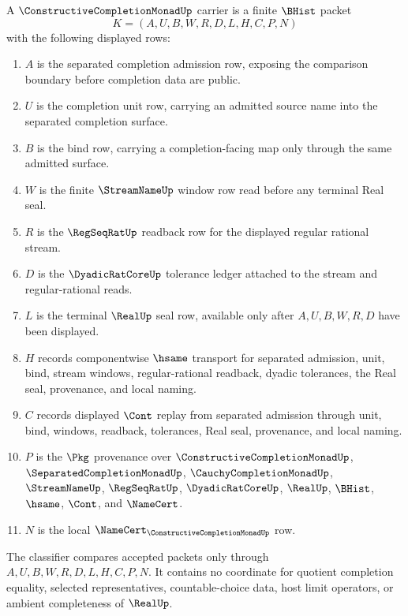 \begin{definition}
\label{def:constructive-completion-monad-carrier}
A $\ConstructiveCompletionMonadUp$ carrier is a finite $\BHist$ packet
$$
K=(A,U,B,W,R,D,L,H,C,P,N)
$$
with the following displayed rows:
\begin{enumerate}
\item $A$ is the separated completion admission row, exposing the comparison boundary before completion data are public.
\item $U$ is the completion unit row, carrying an admitted source name into the separated completion surface.
\item $B$ is the bind row, carrying a completion-facing map only through the same admitted surface.
\item $W$ is the finite $\StreamNameUp$ window row read before any terminal Real seal.
\item $R$ is the $\RegSeqRatUp$ readback row for the displayed regular rational stream.
\item $D$ is the $\DyadicRatCoreUp$ tolerance ledger attached to the stream and regular-rational reads.
\item $L$ is the terminal $\RealUp$ seal row, available only after $A,U,B,W,R,D$ have been displayed.
\item $H$ records componentwise $\hsame$ transport for separated admission, unit, bind, stream windows, regular-rational readback, dyadic tolerances, the Real seal, provenance, and local naming.
\item $C$ records displayed $\Cont$ replay from separated admission through unit, bind, windows, readback, tolerances, Real seal, provenance, and local naming.
\item $P$ is the $\Pkg$ provenance over $\ConstructiveCompletionMonadUp$, $\SeparatedCompletionMonadUp$, $\CauchyCompletionMonadUp$, $\StreamNameUp$, $\RegSeqRatUp$, $\DyadicRatCoreUp$, $\RealUp$, $\BHist$, $\hsame$, $\Cont$, and $\NameCert$.
\item $N$ is the local $\NameCert_{\ConstructiveCompletionMonadUp}$ row.
\end{enumerate}
The classifier compares accepted packets only through $A,U,B,W,R,D,L,H,C,P,N$. It contains no coordinate for quotient completion equality, selected representatives, countable-choice data, host limit operators, or ambient completeness of $\RealUp$.
\end{definition}

